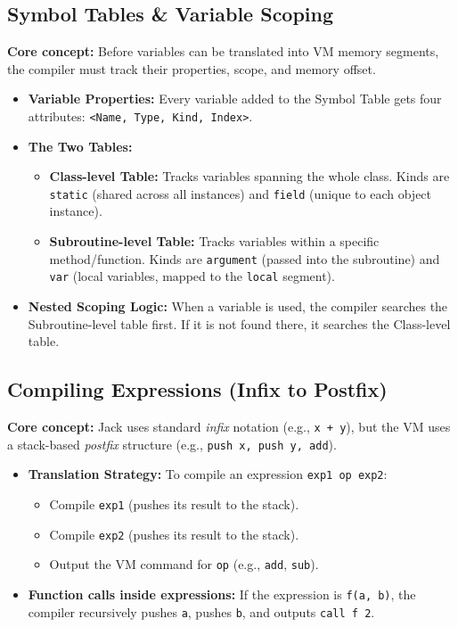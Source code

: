 \documentclass[12pt,a4paper]{article}
\begin{document}
\subsection{Symbol Tables \& Variable Scoping}
\textbf{Core concept:} Before variables can be translated into VM memory segments, the compiler must track their properties, scope, and memory offset.
\begin{itemize}
    \item \textbf{Variable Properties:} Every variable added to the Symbol Table gets four attributes: \texttt{<Name, Type, Kind, Index>}.
    \item \textbf{The Two Tables:}
    \begin{itemize}
        \item \textbf{Class-level Table:} Tracks variables spanning the whole class. Kinds are \texttt{static} (shared across all instances) and \texttt{field} (unique to each object instance).
        \item \textbf{Subroutine-level Table:} Tracks variables within a specific method/function. Kinds are \texttt{argument} (passed into the subroutine) and \texttt{var} (local variables, mapped to the \texttt{local} segment).
    \end{itemize}
    \item \textbf{Nested Scoping Logic:} When a variable is used, the compiler searches the Subroutine-level table first. If it is not found there, it searches the Class-level table. 
\end{itemize}

\subsection{Compiling Expressions (Infix to Postfix)}
\textbf{Core concept:} Jack uses standard \textit{infix} notation (e.g., \texttt{x + y}), but the VM uses a stack-based \textit{postfix} structure (e.g., \texttt{push x, push y, add}).
\begin{itemize}
    \item \textbf{Translation Strategy:} To compile an expression \texttt{exp1 op exp2}:
    \begin{itemize}
        \item Compile \texttt{exp1} (pushes its result to the stack).
        \item Compile \texttt{exp2} (pushes its result to the stack).
        \item Output the VM command for \texttt{op} (e.g., \texttt{add}, \texttt{sub}).
    \end{itemize}
    \item \textbf{Function calls inside expressions:} If the expression is \texttt{f(a, b)}, the compiler recursively pushes \texttt{a}, pushes \texttt{b}, and outputs \texttt{call f 2}.
\end{itemize}
\end{document}
